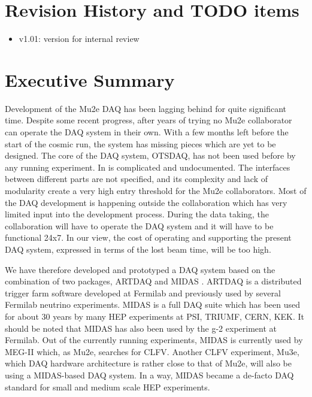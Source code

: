 \documentclass[12pt]{article}
\begin{document}
\section {Revision History and TODO items}

\begin{itemize}
\item
  v1.01: version for internal review
\end{itemize}

% 
\newpage
\section {Executive Summary}

Development of the Mu2e DAQ has been lagging behind for quite significant time.
Despite some recent progress, after years of trying no Mu2e collaborator
can operate the DAQ system in their own. With a few months left before the start of the
cosmic run, the system has missing pieces which are yet to be designed.
%
The core of the DAQ system, OTSDAQ, has not been used before by any running experiment.
In is complicated and undocumented. The interfaces between different parts are not
specified, and its complexity and lack of modularity create a very high entry
threshold for the Mu2e collaborators.
%
Most of the DAQ development is happening outside the collaboration which has very
limited input into the development process.
%
During the data taking, the collaboration will have to operate the DAQ system
and it will have to be functional 24x7. In our view, the cost of operating 
and supporting the present DAQ system, expressed in terms of the lost beam time,
will be too high.

% 
We have therefore developed and prototyped a DAQ system based on the combination of two
packages, ARTDAQ \cite{2017_ARTDAQ_Biery} and MIDAS \cite{2025_MIDAS_WIKI}.
%
ARTDAQ is a distributed trigger farm software developed at Fermilab and previously
used by several Fermilab neutrino experiments. 
%
MIDAS is a full DAQ suite which has been used for about 30 years by many HEP experiments
at PSI, TRIUMF, CERN, KEK. It should be noted that MIDAS has also been used
by the g-2 experiment at Fermilab.
%
Out of the currently running experiments, MIDAS is currently used by MEG-II which,
as Mu2e,  searches for CLFV. Another CLFV experiment, Mu3e, which DAQ hardware architecture
is rather close to that of Mu2e, will also be using a MIDAS-based DAQ system.
In a way, MIDAS became a de-facto DAQ standard for small and medium scale HEP
experiments.
\end{document}
